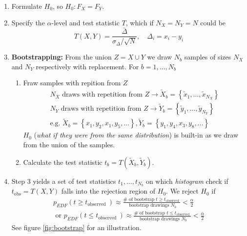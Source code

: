 \begin{enumerate}
    \item Formulate $H_0$, so $H_0: F_X = F_Y$.
    \item Specify the $\alpha$-level and test statistic $T$, which if $N_X = N_Y = N$ could be
    \begin{equation}
        T(X,Y) = \frac{\bar{\Delta}}{\sigma_\Delta \slash \sqrt{N}}, \quad \Delta_i = x_i - y_i
    \end{equation}
    \item \textbf{Bootstrapping:} From the union $Z = X \cup Y$ we draw $N_b$ samples of sizes $N_X$ and $N_Y$ respectively with replacement. For $b = 1,\dots,N_b$
    \begin{enumerate}
        \item Fraw samples with repition from $Z$
        \begin{equation}
            \begin{gathered}
                N_X \text{ draws with repetition from } Z \rightarrow \tilde{X}_b=\left\{\tilde{x}_1, \ldots, \tilde{x}_{N_X}\right\} \\
                N_Y \text{ draws with repetition from } Z \rightarrow \tilde{Y}_b=\left\{\tilde{y}_1, \ldots, \tilde{y}_{N_Y}\right\} \\
                \text{e.g. } \tilde{X}_b=\left\{x_1, y_2, x_1, y_5, \ldots\right\}, \tilde{Y}_b=\left\{y_1, y_4, x_3, y_8, \ldots\right\}
            \end{gathered}
        \end{equation}
        $H_0$ (\textit{what if they were from the same distribution}) is built-in as we draw from the union of the samples.
        \item Calculate the test statistic $t_b = T(\tilde{X}_b,\tilde{Y}_b)$.
    \end{enumerate}
    \item Step 3 yields a set of test statistics $t_1,\dots,t_{N_b}$ on which \textit{histogram} check if $t_{\text{obs}} = T(X,Y)$ falls 
    into the rejection region of $H_0$. We reject $H_0$ if
    \begin{equation}
        \begin{gathered}
            p_{E D F}\left(t \geq t_{\text {observed }}\right) \approx \frac{\# \text { of bootstrap } t \geq t_{\text {observed }}}{\text { bootstrap drawings } N_b}<\frac{\alpha}{2} \\
            \text { or } p_{E D F}\left(t \leq t_{\text {observed }}\right) \approx \frac{\# \text { of bootstrap } t \leq t_{\text {observed }}}{\text { bootstrap drawings } N_b}<\frac{\alpha}{2}
        \end{gathered}
    \end{equation}
    See figure \ref{fig:bootstrap} for an illustration.
\end{enumerate}

